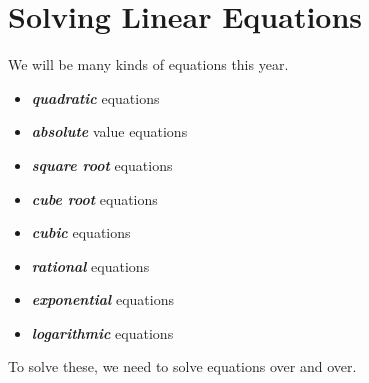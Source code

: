 \section{Solving Linear Equations}

We will be  many kinds of equations this year.

\vspace{1\baselineskip}
\noindent
\myTwoMinipages
{
    \begin{itemize}
        \item { {\bfseries\itshape quadratic} equations }
        \item { {\bfseries\itshape absolute} value equations}
        \item { {\bfseries\itshape square root} equations}
        \item { {\bfseries\itshape cube root} equations}
    \end{itemize}
}
{
    \begin{itemize}
        \item { {\bfseries\itshape cubic} equations}
        \item { {\bfseries\itshape rational} equations}
        \item { {\bfseries\itshape exponential} equations}
        \item { {\bfseries\itshape logarithmic} equations}
    \end{itemize}
}
\vspace{1\baselineskip}

\noindent 
To solve these,
we need to solve  equations 
over and over.




